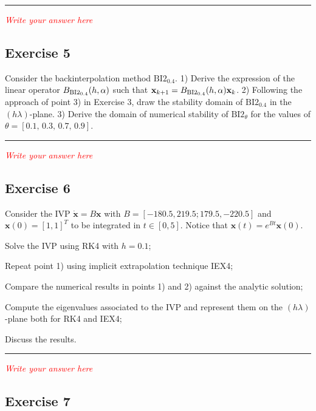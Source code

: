 \documentclass[11pt,a4paper,oneside]{article}
\renewcommand{\vec}[1]{\mathbf{#1}}
\newcommand{\tr}{\textcolor{red}}
\begin{document}
\medskip \hrule \medskip

\tr{\textit{Write your answer here}}

\subsection*{Exercise 5}
Consider the backinterpolation method $\textrm{BI2}_{0.4}$. 1) Derive the expression of the linear operator $B_{\rm BI2_{0.4}}(h,\alpha)$ such that $\vec x_{k+1} = B_{\rm BI2_{0.4}}(h,\alpha) \vec x_k$. 2) Following the approach of point 3) in Exercise 3, draw the stability domain of $\textrm{BI2}_{0.4}$ in the $(h\lambda)$-plane. 3) Derive the domain of numerical stability of $\textrm{BI2}_{\theta}$ for the values of $\theta = [0.1,\, 0.3,\, 0.7,\, 0.9]$.

\medskip \hrule \medskip

\tr{\textit{Write your answer here}}

\subsection*{Exercise 6}

Consider the IVP $\dot{\vec x} = B \vec x$ with $B =[-180.5, 219.5; 179.5, -220.5]$ and $\vec{x}(0)=[1, 1]^T$ to be integrated in $t\in[0, 5]$. Notice that $\vec{x}(t)=e^{Bt}\vec{x}(0)$.
\begin{enumerate*}[label=\arabic*)]
    \item Solve the IVP using RK4 with $h=0.1$;
    \item Repeat point 1) using implicit extrapolation technique IEX4;
    \item Compare the numerical results in points 1) and 2) against the analytic solution;
    \item Compute the eigenvalues associated to the IVP and represent them on the $(h\lambda)$-plane both for RK4 and IEX4;
    \item Discuss the results.
\end{enumerate*}

\medskip \hrule \medskip

\tr{\textit{Write your answer here}}


\subsection*{Exercise 7}
\end{document}
